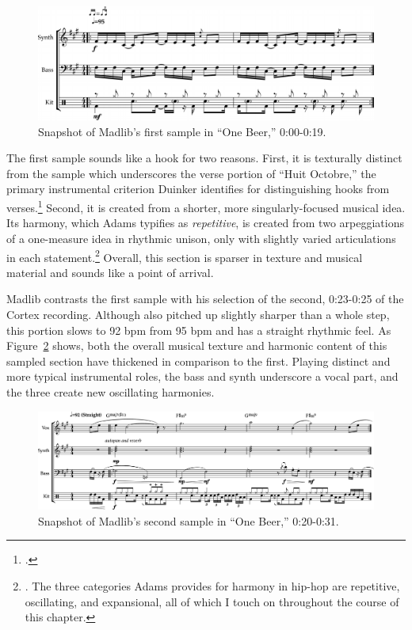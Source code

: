     \begin{figure}[ht]
        \centering
        \includegraphics[width=\textwidth]{images/figures/chp 02/000019onebeerintro.pdf}
        \caption{Snapshot of Madlib's first sample in ``One Beer,'' 0:00-0:19.}
        \label{fig:onebeerintro}
    \end{figure}

The first sample sounds like a hook for two reasons. First, it is texturally distinct from
the sample  which underscores the verse portion of ``Huit Octobre,'' the primary instrumental
criterion Duinker identifies for distinguishing hooks from verses.\footnote{
    \autocite[99]{benduinkerSongFormMainstreaming2020}.}
Second, it is created from a shorter, more singularly-focused musical idea. Its harmony, which
Adams  typifies as \emph{repetitive}, is created from two arpeggiations of a one-measure idea
in rhythmic unison, only with slightly varied articulations in each statement.\footnote{
    \cite{kyleadamsHarmonicSyntacticMotivic2020}. The three categories Adams provides for 
    harmony in hip-hop are repetitive, oscillating, and expansional, all of which I touch on
    throughout the course of this chapter.} 
Overall, this section is sparser in texture and musical material and sounds like a point of
arrival.

Madlib contrasts the first sample with his selection of the second, 0:23-0:25 of the Cortex
recording. Although also pitched up slightly sharper than a whole step, this portion slows 
to 92 bpm from 95 bpm  and has a straight rhythmic feel. As Figure~\ref{fig:onebeermain} 
shows, both the overall musical texture and harmonic content of this sampled section have 
thickened in comparison to the first. Playing distinct and more typical instrumental roles,
the bass and synth underscore a vocal part, and the three create new oscillating harmonies.

    \begin{figure}[ht]
        \centering
        \includegraphics[width=\textwidth]{images/figures/chp 02/020031onebeermain.pdf}
        \caption{Snapshot of Madlib's second sample in ``One Beer,'' 0:20-0:31.}
        \label{fig:onebeermain}
    \end{figure}

